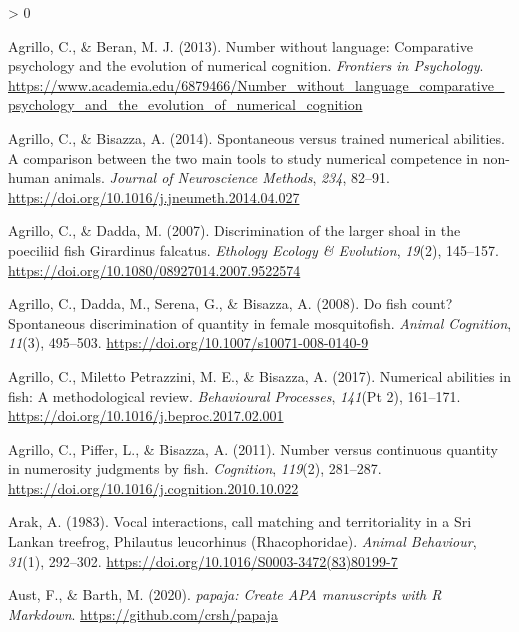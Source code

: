 \documentclass[
  english,
  ,doc,floatsintext]{apa6}
\newlength{\cslhangindent}
\newenvironment{CSLReferences}[2] %
 {%
  \setlength{\parindent}{0pt}
  \ifodd #1 \everypar{\setlength{\hangindent}{\cslhangindent}}\ignorespaces\fi
  \ifnum #2 > 0
  \setlength{\parskip}{#2\baselineskip}
  \fi
 }%
 {}
\begin{document}
\hypertarget{refs}{}
\begin{CSLReferences}{1}{0}
\leavevmode\hypertarget{ref-Agrillo.Beran.2013}{}%
Agrillo, C., \& Beran, M. J. (2013). Number without language: Comparative psychology and the evolution of numerical cognition. \emph{Frontiers in Psychology}. \url{https://www.academia.edu/6879466/Number_without_language_comparative_psychology_and_the_evolution_of_numerical_cognition}

\leavevmode\hypertarget{ref-Agrillo.Bisazza.2014}{}%
Agrillo, C., \& Bisazza, A. (2014). Spontaneous versus trained numerical abilities. {A} comparison between the two main tools to study numerical competence in non-human animals. \emph{Journal of Neuroscience Methods}, \emph{234}, 82--91. \url{https://doi.org/10.1016/j.jneumeth.2014.04.027}

\leavevmode\hypertarget{ref-Agrillo.Dadda.2007}{}%
Agrillo, C., \& Dadda, M. (2007). Discrimination of the larger shoal in the poeciliid fish {Girardinus} falcatus. \emph{Ethology Ecology \& Evolution}, \emph{19}(2), 145--157. \url{https://doi.org/10.1080/08927014.2007.9522574}

\leavevmode\hypertarget{ref-Agrillo.etal.2008}{}%
Agrillo, C., Dadda, M., Serena, G., \& Bisazza, A. (2008). Do fish count? {Spontaneous} discrimination of quantity in female mosquitofish. \emph{Animal Cognition}, \emph{11}(3), 495--503. \url{https://doi.org/10.1007/s10071-008-0140-9}

\leavevmode\hypertarget{ref-Agrillo.etal.2017}{}%
Agrillo, C., Miletto Petrazzini, M. E., \& Bisazza, A. (2017). Numerical abilities in fish: {A} methodological review. \emph{Behavioural Processes}, \emph{141}(Pt 2), 161--171. \url{https://doi.org/10.1016/j.beproc.2017.02.001}

\leavevmode\hypertarget{ref-Agrillo.etal.2011}{}%
Agrillo, C., Piffer, L., \& Bisazza, A. (2011). Number versus continuous quantity in numerosity judgments by fish. \emph{Cognition}, \emph{119}(2), 281--287. \url{https://doi.org/10.1016/j.cognition.2010.10.022}

\leavevmode\hypertarget{ref-Arak.1983}{}%
Arak, A. (1983). Vocal interactions, call matching and territoriality in a {Sri} {Lankan} treefrog, {Philautus} leucorhinus ({Rhacophoridae}). \emph{Animal Behaviour}, \emph{31}(1), 292--302. \url{https://doi.org/10.1016/S0003-3472(83)80199-7}

\leavevmode\hypertarget{ref-R-papaja}{}%
Aust, F., \& Barth, M. (2020). \emph{{papaja}: {Create} {APA} manuscripts with {R Markdown}}. \url{https://github.com/crsh/papaja}


\end{CSLReferences}
\end{document}
